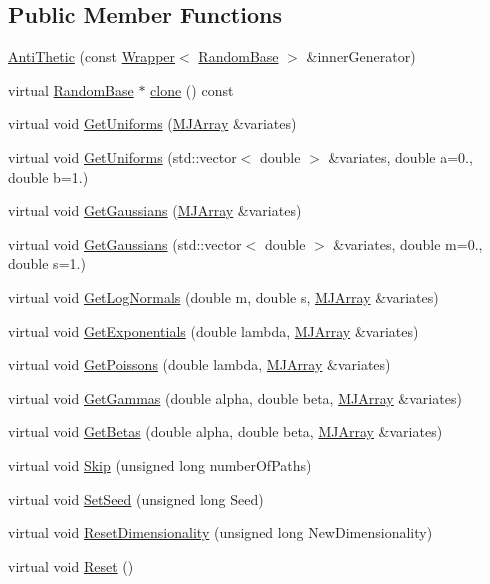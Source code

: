 \subsection*{Public Member Functions}
\begin{DoxyCompactItemize}
\item 
\hyperlink{classAntiThetic_aa79b36bdd2f341f5ad2b41f141950044}{Anti\+Thetic} (const \hyperlink{classWrapper}{Wrapper}$<$ \hyperlink{classRandomBase}{Random\+Base} $>$ \&inner\+Generator)
\item 
virtual \hyperlink{classRandomBase}{Random\+Base} $\ast$ \hyperlink{classAntiThetic_ab736855d3978fdc1ff914239cfc51a9d}{clone} () const
\item 
virtual void \hyperlink{classAntiThetic_affc5dff1f5783cb68f3933dd7b25c83a}{Get\+Uniforms} (\hyperlink{classMJArray}{M\+J\+Array} \&variates)
\item 
virtual void \hyperlink{classAntiThetic_a189ea07e81121c1ae4f3c655ec405487}{Get\+Uniforms} (std\+::vector$<$ double $>$ \&variates, double a=0., double b=1.)
\item 
virtual void \hyperlink{classAntiThetic_ac680e938752f4d5b2a5ba51f5d4862e2}{Get\+Gaussians} (\hyperlink{classMJArray}{M\+J\+Array} \&variates)
\item 
virtual void \hyperlink{classAntiThetic_a82340ce519d6dbdf75f6270193eea703}{Get\+Gaussians} (std\+::vector$<$ double $>$ \&variates, double m=0., double s=1.)
\item 
virtual void \hyperlink{classAntiThetic_ad14fda6b35f6370d744d0ea53d5b80ba}{Get\+Log\+Normals} (double m, double s, \hyperlink{classMJArray}{M\+J\+Array} \&variates)
\item 
virtual void \hyperlink{classAntiThetic_aa4ee18288564b74c7a2d7e5015e87d6c}{Get\+Exponentials} (double lambda, \hyperlink{classMJArray}{M\+J\+Array} \&variates)
\item 
virtual void \hyperlink{classAntiThetic_af37fd70c21d1d4bf65a0494a4a8c5459}{Get\+Poissons} (double lambda, \hyperlink{classMJArray}{M\+J\+Array} \&variates)
\item 
virtual void \hyperlink{classAntiThetic_a367486230368c4624cabf6172b97dafe}{Get\+Gammas} (double alpha, double beta, \hyperlink{classMJArray}{M\+J\+Array} \&variates)
\item 
virtual void \hyperlink{classAntiThetic_a84fc41c2b4e5a1de78f3399e21c067f8}{Get\+Betas} (double alpha, double beta, \hyperlink{classMJArray}{M\+J\+Array} \&variates)
\item 
virtual void \hyperlink{classAntiThetic_ab401f6a7ce58643b3f147886d837e097}{Skip} (unsigned long number\+Of\+Paths)
\item 
virtual void \hyperlink{classAntiThetic_a0561b133af3db59319d7ede6a52fb1d4}{Set\+Seed} (unsigned long Seed)
\item 
virtual void \hyperlink{classAntiThetic_afb5d6c15a5729be709d905d81582e1b7}{Reset\+Dimensionality} (unsigned long New\+Dimensionality)
\item 
virtual void \hyperlink{classAntiThetic_a54f6452f0017f86580b7af9dfa0172e4}{Reset} ()
\end{DoxyCompactItemize}



